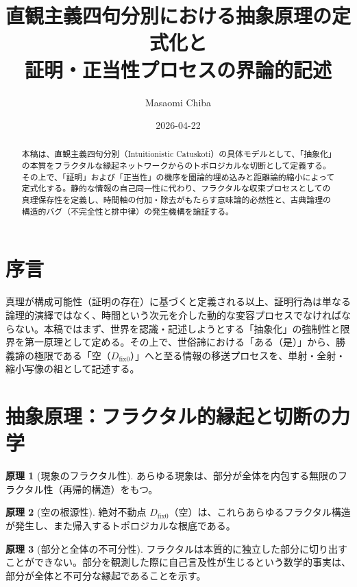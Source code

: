 \documentclass[11pt,a4paper]{article}
\theoremstyle{definition}
\newtheorem{principle}{原理}[section]
\newcommand{\dfix}{D_{\mathrm{fix}0}} %
\begin{document}
\title{直観主義四句分別における抽象原理の定式化と\\証明・正当性プロセスの界論的記述}
\author{Masaomi Chiba}
\date{2026-04-22}
\maketitle

\begin{abstract}
本稿は、直観主義四句分別（Intuitionistic Catuskoti）の具体モデルとして、「抽象化」の本質をフラクタルな縁起ネットワークからのトポロジカルな切断として定義する。その上で、「証明」および「正当性」の機序を圏論的埋め込みと距離論的縮小によって定式化する。静的な情報の自己同一性に代わり、フラクタルな収束プロセスとしての真理保存性を定義し、時間軸の付加・除去がもたらす意味論的必然性と、古典論理の構造的バグ（不完全性と排中律）の発生機構を論証する。
\end{abstract}

\section*{序言}
真理が構成可能性（証明の存在）に基づくと定義される以上、証明行為は単なる論理的演繹ではなく、時間という次元を介した動的な変容プロセスでなければならない。本稿ではまず、世界を認識・記述しようとする「抽象化」の強制性と限界を第一原理として定める。その上で、世俗諦における「ある（是）」から、勝義諦の極限である「空（$\dfix$）」へと至る情報の移送プロセスを、単射・全射・縮小写像の組として記述する。

\section{抽象原理：フラクタル的縁起と切断の力学}

\begin{principle}[現象のフラクタル性]
あらゆる現象は、部分が全体を内包する無限のフラクタル性（再帰的構造）をもつ。
\end{principle}

\begin{principle}[空の根源性]
絶対不動点 $\dfix$（空）は、これらあらゆるフラクタル構造が発生し、また帰入するトポロジカルな根底である。
\end{principle}

\begin{principle}[部分と全体の不可分性]
フラクタルは本質的に独立した部分に切り出すことができない。部分を観測した際に自己言及性が生じるという数学的事実は、部分が全体と不可分な縁起であることを示す。
\end{principle}
\end{document}
